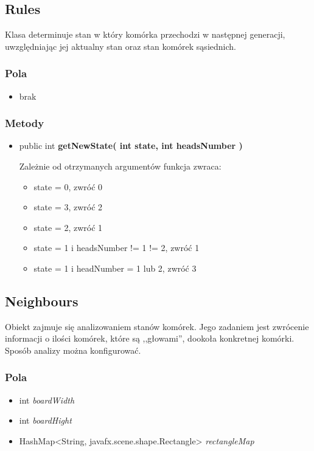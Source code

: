 \documentclass[a4paper,11pt]{article}
\begin{document}
\subsection{Rules}
Klasa determinuje stan w który komórka przechodzi w następnej generacji, uwzględniając jej aktualny stan oraz stan komórek sąsiednich. 

\subsubsection{Pola}
\begin{itemize}
\item brak
\end{itemize}
\subsubsection{Metody}
\begin{itemize}
\item public int  \textbf{getNewState( int state, int headsNumber )}

Zależnie od otrzymanych argumentów funkcja zwraca:
\begin{itemize}
\item state = 0, zwróć 0
\item state = 3, zwróć 2
\item state = 2, zwróć 1
\item state = 1 i headsNumber != 1 != 2, zwróć 1
\item state = 1 i headNumber = 1 lub 2, zwróć 3

\end{itemize}

\end{itemize}

\subsection{Neighbours}
Obiekt zajmuje się analizowaniem stanów komórek. Jego zadaniem jest zwrócenie informacji o ilości komórek, które są ,,głowami'', dookoła konkretnej komórki. Sposób analizy można konfigurować.

\subsubsection{Pola}
\begin{itemize}
\item int  \textit{boardWidth}
\item int  \textit{boardHight}
\item HashMap<String, javafx.scene.shape.Rectangle> \textit{rectangleMap}
\end{itemize}
\end{document}
